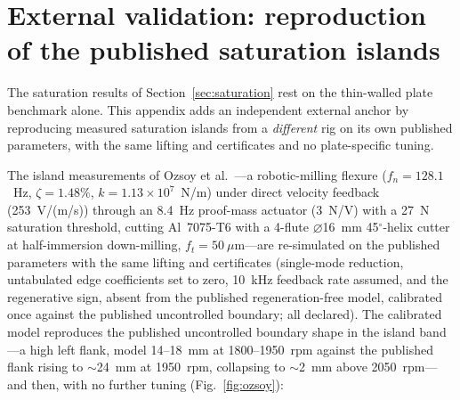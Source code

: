 \documentclass[preprint,12pt]{elsarticle}
\begin{document}
\appendix
\setcounter{figure}{0}
\section{External validation: reproduction of the published saturation
islands}
\label{sec:ozsoy}

The saturation results of Section~\ref{sec:saturation} rest on the
thin-walled plate benchmark alone. This appendix adds an independent
external anchor by reproducing measured saturation islands from a
\emph{different} rig on its own published parameters, with the same
lifting and certificates and no plate-specific tuning.

The island measurements of Ozsoy et al.~\cite{ozsoy2025mssp}---a
robotic-milling flexure ($f_n = 128.1$~Hz, $\zeta = 1.48\%$,
$k = 1.13\times 10^7$~N/m) under direct velocity feedback (253~V/(m/s))
through an 8.4~Hz proof-mass actuator (3~N/V) with a 27~N saturation
threshold, cutting Al~7075-T6 with a 4-flute $\varnothing$16~mm
45$^\circ$-helix cutter at half-immersion down-milling,
$f_t = 50~\mu$m---are re-simulated on the published parameters with the
same lifting and certificates (single-mode reduction, untabulated edge
coefficients set to zero, 10~kHz feedback rate assumed, and the
regenerative sign, absent from the published regeneration-free model,
calibrated once against the published uncontrolled boundary; all
declared). The calibrated model reproduces the published uncontrolled
boundary shape in the island band---a high left flank, model 14--18~mm
at 1800--1950~rpm against the published flank rising to $\sim$24~mm at
1950~rpm, collapsing to $\sim$2~mm above 2050~rpm---and then, with no
further tuning (Fig.~\ref{fig:ozsoy}):
\end{document}
